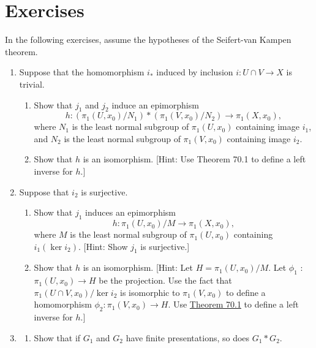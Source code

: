 \section*{Exercises}
In the following exercises, assume the hypotheses of the Seifert-van Kampen theorem.
\begin{enumerate}[itemsep=0.4em, parsep=0pt, topsep=0pt, partopsep=0pt, leftmargin=*, label=\arabic*., ref=\arabic*]
\item Suppose that the homomorphism \(i_{ * }\) induced by inclusion \(i : U \cap V \rightarrow X\) is trivial.
 \begin{enumerate}[itemsep=0.2em, parsep=0pt, topsep=0pt, partopsep=0pt, leftmargin=*, label=(\alph*), align=left]
 \item Show that \(j_{1}\) and \(j_{2}\) induce an epimorphism \[ h : ( {{\pi }_{1}( {U,x_{0}}) /N_{1}}) * ( {{\pi }_{1}( {V,x_{0}}) /N_{2}}) \rightarrow {\pi }_{1}( {X,x_{0}}), \] where \(N_{1}\) is the least normal subgroup of \({\pi }_{1}( {U,x_{0}})\) containing image \(i_{1}\), and \(N_{2}\) is the least normal subgroup of \({\pi }_{1}( {V,x_{0}})\) containing image \(i_{2}\).
 \item Show that \(h\) is an isomorphism. [Hint: Use Theorem 70.1 to define a left inverse for \(h\).]
 \end{enumerate}
\item Suppose that \(i_{2}\) is surjective.
 \begin{enumerate}[itemsep=0.2em, parsep=0pt, topsep=0pt, partopsep=0pt, leftmargin=*, label=(\alph*), align=left]
 \item Show that \(j_{1}\) induces an epimorphism \[ h : {\pi }_{1}( {U,x_{0}}) /M \rightarrow {\pi }_{1}( {X,x_{0}}), \] where \(M\) is the least normal subgroup of \({\pi }_{1}( {U,x_{0}})\) containing \(i_{1}( {\ker {i}_{2}})\). [Hint: Show \(j_{1}\) is surjective.]
 \item Show that \(h\) is an isomorphism. [Hint: Let \(H = {\pi }_{1}( {U,x_{0}}) /M\). Let \({\phi }_{1}\) : \({\pi }_{1}( {U,x_{0}}) \rightarrow H\) be the projection. Use the fact that \({\pi }_{1}( {U \cap V,x_{0}}) /\ker {i}_{2}\) is isomorphic to \({\pi }_{1}( {V,x_{0}})\) to define a homomorphism \({\phi }_{2} : {\pi }_{1}( {V,x_{0}}) \rightarrow H\). Use \hyperref[thm:70.1]{Theorem 70.1} to define a left inverse for \(h\).]
 \end{enumerate}
\item
 \begin{enumerate}[itemsep=0.2em, parsep=0pt, topsep=0pt, partopsep=0pt, leftmargin=*, label=(\alph*), align=left]
 \item Show that if \(G_{1}\) and \(G_{2}\) have finite presentations, so does \(G_{1} * G_{2}\).


\end{enumerate}
\end{enumerate}
